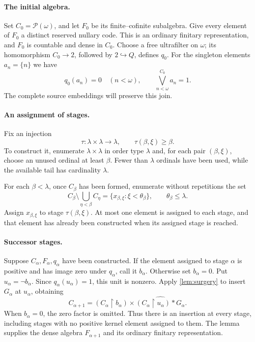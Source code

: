 \documentclass[11pt]{article}
\theoremstyle{definition}
\theoremstyle{remark}
\newcommand{\restr}{\mathbin{\upharpoonright}}
\begin{document}
\paragraph{The initial algebra.}
Set $C_0=\mathcal P(\omega)$, and let $F_0$ be its finite--cofinite
subalgebra. Give every element of $F_0$ a distinct reserved nullary
code. This is an ordinary finitary representation, and $F_0$ is
countable and dense in $C_0$. Choose a free ultrafilter on $\omega$;
its homomorphism $C_0\to2$, followed by $2\hookrightarrow Q$, defines
$q_0$. For the singleton elements $a_n=\{n\}$ we have
\begin{equation}\label{eq:initial-kernel-density}
 q_0(a_n)=0\quad(n<\omega),
 \qquad \bigvee_{n<\omega}^{C_0}a_n=1.
\end{equation}
The complete source embeddings will preserve this join.

\paragraph{An assignment of stages.}
Fix an injection
\[
 \tau:\lambda\times\lambda\longrightarrow\lambda,
 \qquad \tau(\beta,\xi)\geq\beta.
\]
To construct it, enumerate $\lambda\times\lambda$ in order type
$\lambda$ and, for each pair $(\beta,\xi)$, choose an unused ordinal
at least $\beta$. Fewer than $\lambda$ ordinals have been used, while
the available tail has cardinality $\lambda$.

For each $\beta<\lambda$, once $C_\beta$ has been formed, enumerate
without repetitions the set
\[
 C_\beta\setminus\bigcup_{\eta<\beta}C_\eta
   =\{x_{\beta,\xi}:\xi<\theta_\beta\},
 \qquad\theta_\beta\leq\lambda.
\]
Assign $x_{\beta,\xi}$ to stage $\tau(\beta,\xi)$. At most one
element is assigned to each stage, and that element has already been
constructed when its assigned stage is reached.

\paragraph{Successor stages.}
Suppose $C_\alpha,F_\alpha,q_\alpha$ have been constructed. If the
element assigned to stage $\alpha$ is positive and has image zero
under $q_\alpha$, call it $b_\alpha$. Otherwise set $b_\alpha=0$.
Put $u_\alpha=\neg b_\alpha$. Since
$q_\alpha(u_\alpha)=1$, this unit is nonzero. Apply
\cref{lem:surgery} to insert $G_\alpha$ at $u_\alpha$, obtaining
\begin{equation}\label{eq:construction-surgery}
 C_{\alpha+1}
  =(C_\alpha\restr b_\alpha)\times
      \widehat{(C_\alpha\restr u_\alpha)*G_\alpha}.
\end{equation}
When $b_\alpha=0$, the zero factor is omitted. Thus there is an
insertion at every stage, including stages with no positive kernel
element assigned to them. The lemma supplies the dense algebra
$F_{\alpha+1}$ and its ordinary finitary representation.
\end{document}

